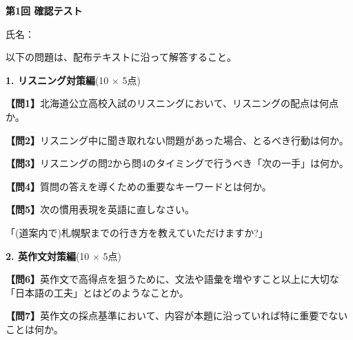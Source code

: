 
\begin{center}
{\LARGE\textbf{第1回 確認テスト}}
\end{center}

\vspace{0.4em}
\begin{flushright}
氏名：\underline{\hspace{15em}}
\end{flushright}

\vspace{0.5em}
\noindent 以下の問題は、配布テキストに沿って解答すること。

\vspace{0.5em}
\noindent\textbf{1. リスニング対策編}(10 $\times$ 5点)

\noindent\textbf{【問1】}北海道公立高校入試のリスニングにおいて、リスニングの配点は何点か。

\testblank[35点]{10em}
\vfill

\noindent\textbf{【問2】}リスニング中に聞き取れない問題があった場合、とるべき行動は何か。

\vfill

\noindent\textbf{【問3】}リスニングの問2から問4のタイミングで行うべき「次の一手」は何か。

\vfill

\noindent\textbf{【問4】}質問の答えを導くための重要なキーワードとは何か。

\vfill

\noindent\textbf{【問5】}次の慣用表現を英語に直しなさい。

「(道案内で)札幌駅までの行き方を教えていただけますか?」

\vfill

\noindent\textbf{2. 英作文対策編}(10 $\times$ 5点)

\noindent\textbf{【問6】}英作文で高得点を狙うために、文法や語彙を増やすこと以上に大切な「日本語の工夫」とはどのようなことか。

\vfill

\noindent\textbf{【問7】}英作文の採点基準において、内容が本題に沿っていれば特に重要でないことは何か。

\vfill

